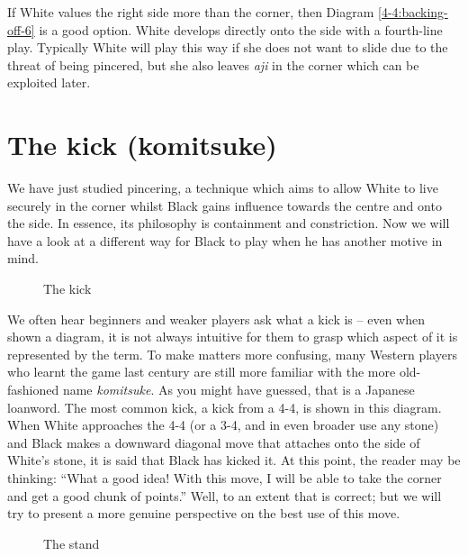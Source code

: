 \documentclass[a5paper,12pt,twoside]{book} %
\newcounter{joseki}                 %
\newcommand{\dref}[1]{Diagram \ref{#1}}
\newcommand{\addstufftotoc}[2][toc]{%
  \addtocontents{#1}{#2}}
\begin{document}
\addstufftotoc{\nobreak\smallskip\protect\par}

If White values the right side more than the corner, then \dref{4-4:backing-off-6} is a good option. White develops directly onto the side with a fourth-line play. Typically White will play this way if she does not want to slide due to the threat of being pincered, but she also leaves \textit{aji} in the corner which can be exploited later.\\

\section{The kick (komitsuke)\label{sec:4-4:kick}}

We have just studied pincering, a technique which aims to allow White to live securely in the corner whilst Black gains influence towards the centre and onto the side. In essence, its philosophy is containment and constriction. Now we will have a look at a different way for Black to play when he has another motive in mind.\\

\begin{figure}[!htbp]
 
\vspace{-0.6cm}\caption{The kick}
\label{4-4:kick-1}
\end{figure}

We often hear beginners and weaker players ask what a kick is – even when shown a diagram, it is not always intuitive for them to grasp which aspect of it is represented by the term. To make matters more confusing, many Western players who learnt the game last century are still more familiar with the more old-fashioned name \textit{komitsuke}. As you might have guessed, that is a Japanese loanword. The most common kick, a kick from a 4-4, is shown in this diagram. When White approaches the 4-4 (or a 3-4, and in even broader use any stone) and Black makes a downward diagonal move that attaches onto the side of White's stone, it is said that Black has kicked it. At this point, the reader may be thinking: ``What a good idea! With this move, I will be able to take the corner and get a good chunk of points.'' Well, to an extent that is correct; but we will try to present a more genuine perspective on the best use of this move.\\

\begin{figure}[!htbp]
 
\vspace{-0.6cm}\caption{The stand}
\label{4-4:kick-2}
\end{figure}
\end{document}
